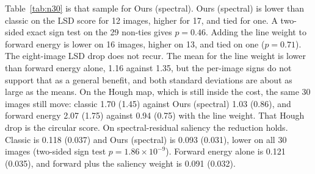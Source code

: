 \documentclass[10pt,twocolumn,letterpaper]{article}
\begin{document}
Table~\ref{tab:n30} is that sample for Ours (spectral).
Ours (spectral) is lower than classic on the LSD score for 12 images, higher for 17, and tied for one.
A two-sided exact sign test on the 29 non-ties gives $p = 0.46$.
Adding the line weight to forward energy is lower on 16 images, higher on 13, and tied on one ($p = 0.71$).
The eight-image LSD drop does not recur.
The mean for the line weight is lower than forward energy alone, 1.16 against 1.35, but the per-image signs do not support that as a general benefit, and both standard deviations are about as large as the means.
On the Hough map, which is still inside the cost, the same 30 images still move: classic 1.70 (1.45) against Ours (spectral) 1.03 (0.86), and forward energy 2.07 (1.75) against 0.94 (0.75) with the line weight.
That Hough drop is the circular score.
On spectral-residual saliency the reduction holds.
Classic is 0.118 (0.037) and Ours (spectral) is 0.093 (0.031), lower on all 30 images (two-sided sign test $p = 1.86 \times 10^{-9}$).
Forward energy alone is 0.121 (0.035), and forward plus the saliency weight is 0.091 (0.032).
\end{document}
